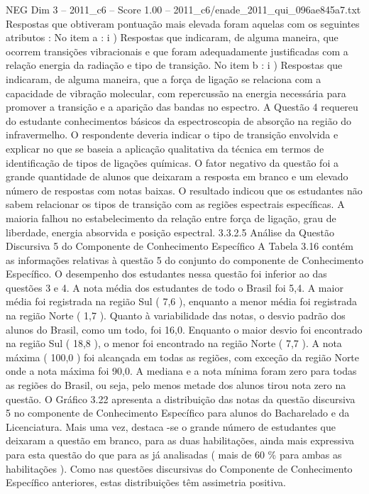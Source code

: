 \begin{textsample}{NEG Dim 3 – 2011\_c6 – Score 1.00 – 2011\_c6/enade\_2011\_qui\_096ae845a7.txt}
Respostas que obtiveram pontuação mais elevada foram aquelas com os seguintes atributos : No item a : i ) Respostas que indicaram, de alguma maneira, que ocorrem transições vibracionais e que foram adequadamente justificadas com a relação energia da radiação e tipo de transição.
No item b : i ) Respostas que indicaram, de alguma maneira, que a força de ligação se relaciona com a capacidade de vibração molecular, com repercussão na energia necessária para promover a transição e a aparição das bandas no espectro.
A Questão 4 requereu do estudante conhecimentos básicos da espectroscopia de absorção na região do infravermelho.
O respondente deveria indicar o tipo de transição envolvida e explicar no que se baseia a aplicação qualitativa da técnica em termos de identificação de tipos de ligações químicas.
O fator negativo da questão foi a grande quantidade de alunos que deixaram a resposta em branco e um elevado número de respostas com notas baixas.
O resultado indicou que os estudantes não sabem relacionar os tipos de transição com as regiões espectrais específicas.
A maioria falhou no estabelecimento da relação entre força de ligação, grau de liberdade, energia absorvida e posição espectral. 3.3.2.5 Análise da Questão Discursiva 5 do Componente de Conhecimento Específico A Tabela 3.16 contém as informações relativas à questão 5 do conjunto do componente de Conhecimento Específico.
O desempenho dos estudantes nessa questão foi inferior ao das questões 3 e 4.
A nota média dos estudantes de todo o Brasil foi 5,4.
A maior média foi registrada na região Sul ( 7,6 ), enquanto a menor média foi registrada na região Norte ( 1,7 ).
Quanto à variabilidade das notas, o desvio padrão dos alunos do Brasil, como um todo, foi 16,0.
Enquanto o maior desvio foi encontrado na região Sul ( 18,8 ), o menor foi encontrado na região Norte ( 7,7 ).
A nota máxima ( 100,0 ) foi alcançada em todas as regiões, com exceção da região Norte onde a nota máxima foi 90,0.
A mediana e a nota mínima foram zero para todas as regiões do Brasil, ou seja, pelo menos metade dos alunos tirou nota zero na questão.
O Gráfico 3.22 apresenta a distribuição das notas da questão discursiva 5 no componente de Conhecimento Específico para alunos do Bacharelado e da Licenciatura.
Mais uma vez, destaca -se o grande número de estudantes que deixaram a questão em branco, para as duas habilitações, ainda mais expressiva para esta questão do que para as já analisadas ( mais de 60 \% para ambas as habilitações ).
Como nas questões discursivas do Componente de Conhecimento Específico anteriores, estas distribuições têm assimetria positiva.

\end{textsample}
